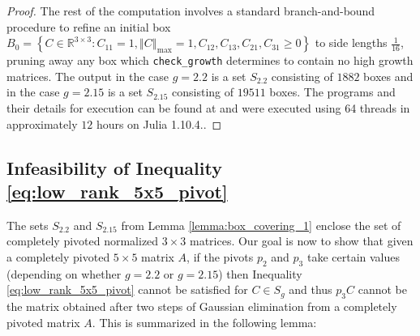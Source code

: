 \documentclass[reqno]{amsart}
\numberwithin{equation}{section}
\newcommand\R{\mathbb{R}}
\newcommand{\norm}[1]{\left\Vert #1 \right\Vert}
\newcommand{\set}[1]{\left\{#1\right\}}
\begin{document}
\begin{proof}
    The rest of the computation involves a standard branch-and-bound procedure to refine an initial box $B_0 = \set{C \in \R^{3 \times 3} : C_{11} = 1, \norm{C}_{\max} = 1, C_{12}, C_{13}, C_{21}, C_{31} \geq 0}$ to side lengths $\frac{1}{16}$, pruning away any box which \texttt{check\_growth} determines to contain no high growth matrices. The output in the case $g=2.2$ is a set $S_{2.2}$ consisting of $1882$ boxes and in the case $g=2.15$ is a set $S_{2.15}$ consisting of $19511$ boxes. The programs and their details for execution can be found at \cite{githubrepo} and were executed using 64 threads in approximately $12$ hours on Julia 1.10.4..
\end{proof}

\subsection{Infeasibility of Inequality \eqref{eq:low_rank_5x5_pivot}} \label{sub:infeas}
The sets $S_{2.2}$ and $S_{2.15}$ from Lemma \ref{lemma:box_covering_1} enclose the set of completely pivoted normalized $3 \times 3$ matrices. Our goal is now to show that given a completely pivoted $5 \times 5$ matrix $A$, if the pivots $p_2$ and $p_3$ take certain values (depending on whether $g=2.2$ or $g=2.15$) then Inequality \eqref{eq:low_rank_5x5_pivot} cannot be satisfied for $C \in S_g$ and thus $p_3 C$ cannot be the matrix obtained after two steps of Gaussian elimination from a completely pivoted matrix $A$. This is summarized in the following lemma:
\end{document}
